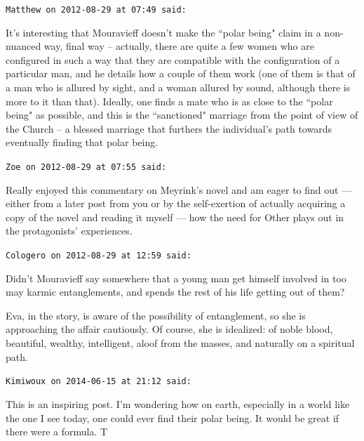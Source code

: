 \begin{footnotesize}\begin{sffamily}



\texttt{Matthew on 2012-08-29 at 07:49 said: }

It's interesting that Mouravieff doesn't make the ``polar being" claim in a non-nuanced way, final way – actually, there are quite a few women who are configured in such a way that they are compatible with the configuration of a particular man, and he details how a couple of them work (one of them is that of a man who is allured by sight, and a woman allured by sound, although there is more to it than that). Ideally, one finds a mate who is as close to the ``polar being" as possible, and this is the ``sanctioned" marriage from the point of view of the Church – a blessed marriage that furthers the individual's path towards eventually finding that polar being.


\hfill

\texttt{Zoe on 2012-08-29 at 07:55 said: }

Really enjoyed this commentary on Meyrink's novel and am eager to find out — either from a later post from you or by the self-exertion of actually acquiring a copy of the novel and reading it myself — how the need for Other plays out in the protagonists' experiences.


\hfill

\texttt{Cologero on 2012-08-29 at 12:59 said: }

Didn't Mouravieff say somewhere that a young man get himself involved in too may karmic entanglements, and spends the rest of his life getting out of them?

Eva, in the story, is aware of the possibility of entanglement, so she is approaching the affair cautiously. Of course, she is idealized: of noble blood, beautiful, wealthy, intelligent, aloof from the masses, and naturally on a spiritual path.


\hfill

\texttt{Kimiwoux on 2014-06-15 at 21:12 said: }

This is an inspiring post. I'm wondering how on earth, especially in a world like the one I see today, one could ever find their polar being. It would be great if there were a formula. T


\end{sffamily}\end{footnotesize}
